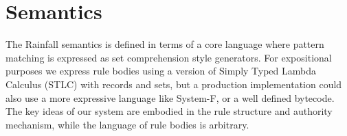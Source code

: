 
\section{Semantics}
The Rainfall semantics is defined in terms of a core language where pattern matching is expressed as set comprehension style generators. For expositional purposes we express rule bodies using a version of Simply Typed Lambda Calculus (STLC) with records and sets, but a production implementation could also use a more expressive language like System-F, or a well defined bytecode. The key ideas of our system are embodied in the rule structure and authority mechanism, while the language of rule bodies is arbitrary.


